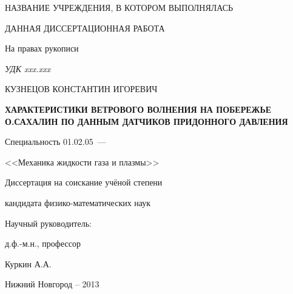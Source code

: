 \thispagestyle{empty}

\begin{center}
НАЗВАНИЕ УЧРЕЖДЕНИЯ, В КОТОРОМ ВЫПОЛНЯЛАСЬ\par
ДАННАЯ ДИССЕРТАЦИОННАЯ РАБОТА\par
\par
\end{center}

\vspace{20mm}
\begin{flushright}
На правах рукописи

{\sl УДК xxx.xxx}
\end{flushright}

\vspace{30mm}
\begin{center}
{\large КУЗНЕЦОВ КОНСТАНТИН ИГОРЕВИЧ}
\end{center}

\vspace{5mm}
\begin{center}
{\bf \large ХАРАКТЕРИСТИКИ ВЕТРОВОГО ВОЛНЕНИЯ НА ПОБЕРЕЖЬЕ О.САХАЛИН ПО ДАННЫМ ДАТЧИКОВ ПРИДОННОГО ДАВЛЕНИЯ
\par}

\vspace{10mm}
{%
Специальность 01.02.05~---

<<Механика жидкости газа и плазмы>>
}

\vspace{10mm}
Диссертация на соискание учёной степени

кандидата физико-математических наук
\end{center}

\vspace{20mm}
\begin{flushright}
Научный руководитель:

д.ф.-м.н., профессор

Куркин А.А.

\end{flushright}

\vspace{20mm}
\begin{center}
{Нижний Новгород -- 2013}
\end{center}

\newpage

